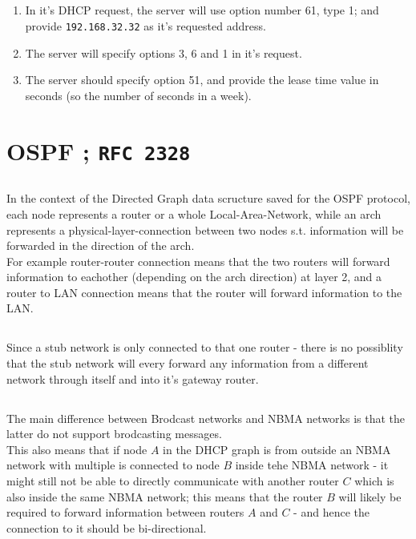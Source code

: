 \subsection{}
\begin{enumerate}[label=\alph*.]
	\item In it's DHCP request, the server will use
	option number 61, type 1; and provide \texttt{192.168.32.32}
	as it's requested address.
	\item The server will specify options 3, 6 and 1 in it's request.
	\item The server should specify option 51,
	and provide the lease time value in seconds (so the number of seconds in a week).
\end{enumerate}

\section{OSPF ; \texttt{RFC 2328}}
\subsection{}
In the context of the Directed Graph data scructure saved for the OSPF
protocol, each node represents a router or a whole Local-Area-Network, while an arch represents
a physical-layer-connection between two nodes s.t. information will be forwarded in the direction of the arch.\\
For example router-router connection
means that the two routers will forward information to eachother (depending on the arch direction) at layer 2, and a router to LAN connection
means that the router will forward information to the LAN.

\subsection{}
Since a stub network is only connected to that one router - there is
no possiblity that the stub network will every forward any information from
a different network through itself and into it's gateway router.

\subsection{}
The main difference between Brodcast networks and NBMA networks
is that the latter do not support brodcasting messages.\\
This also means that if node $A$ in the DHCP graph is from outside an
NBMA network with multiple is connected to node $B$ inside
tehe NBMA network - it might still not be able to directly communicate
with another router $C$ which is also inside the same NBMA network;
this means that the router $B$ will likely be required to forward information between
routers $A$ and $C$ - and hence the connection to it should be bi-directional.


